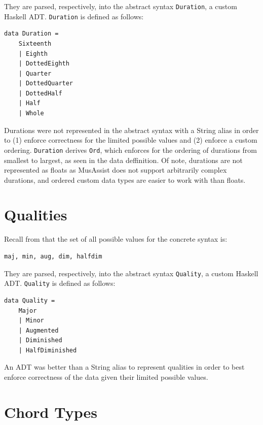 \documentclass{report}
\newcommand\param[1]{\textttu{<#1>}}
\begin{document}
They are parsed, respectively, into the abstract syntax \verb.Duration., a custom Haskell ADT. \verb.Duration. is defined as follows:

\begin{verbatim}
data Duration = 
    Sixteenth
    | Eighth 
    | DottedEighth 
    | Quarter 
    | DottedQuarter 
    | DottedHalf 
    | Half 
    | Whole 
\end{verbatim}

Durations were not represented in the abstract syntax with a String alias in order to (1) enforce correctness for the limited possible values and (2) enforce a custom ordering. \verb.Duration. derives \verb.Ord., which enforces for the ordering of durations from smallest to largest, as seen in the data deffinition. Of note, durations are not represented as floats as MusAssist does not support arbitrarily complex durations, and ordered custom data types are easier to work with than floats.

\section{Qualities}

Recall from   that the set of all possible values for the concrete syntax \param{QUALITY} is:
\begin{verbatim}
maj, min, aug, dim, halfdim
\end{verbatim}

They are parsed, respectively, into the abstract syntax \verb.Quality., a custom Haskell ADT. \verb.Quality. is defined as follows:

\begin{verbatim}
data Quality = 
    Major 
    | Minor
    | Augmented 
    | Diminished
    | HalfDiminished
\end{verbatim}

An ADT was better than a String alias to represent qualities in order to best enforce correctness of the data given their limited possible values. 
\section{Chord Types}
\end{document}
